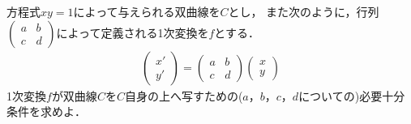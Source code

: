 \documentclass[../../main.tex]{subfiles}
\begin{document}
方程式$xy=1$によって与えられる双曲線を$C$とし，
また次のように，行列$
\begin{pmatrix} a & b \\ c & d
\end{pmatrix}$によって定義される1次変換を$f$とする．
\begin{align*}
  \begin{pmatrix} x' \\ y'
  \end{pmatrix}=
  \begin{pmatrix} a & b \\ c & d
  \end{pmatrix}
  \begin{pmatrix} x \\ y
  \end{pmatrix}
\end{align*}
1次変換$f$が双曲線$C$を$C$自身の上へ写すための($a$，$b$，$c$，$d$についての)必要十分条件を求めよ．
\end{document}
